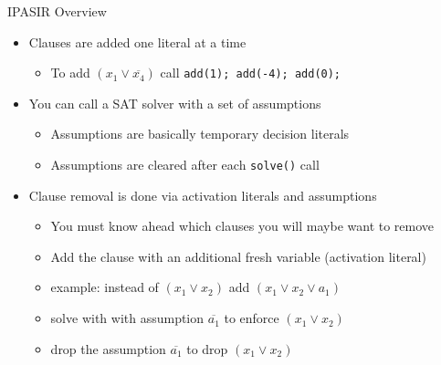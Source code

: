 \documentclass[t]{sdqbeamer}
\begin{document}
\begin{frame}{IPASIR Overview}
\begin{itemize}
\item Clauses are added one literal at a time
\begin{itemize}
	\item To add $(x_1 \vee \overline{x_4})$ call \texttt{add(1); add(-4); add(0);}
\end{itemize}
\item You can call a SAT solver with a set of assumptions
\begin{itemize}
	\item Assumptions are basically temporary decision literals
	\item Assumptions are cleared after each \texttt{solve()} call
\end{itemize}
\item Clause removal is done via activation literals and assumptions
\begin{itemize}
	\item You must know ahead which clauses you will maybe want to remove
	\item Add the clause with an additional fresh variable (activation literal)
	\item example: instead of $(x_1 \vee x_2)$ add $(x_1 \vee x_2 \vee a_1)$
	\item solve with with assumption $\overline{a_1}$ to enforce $(x_1 \vee x_2)$
	\item drop the assumption $\overline{a_1}$ to drop $(x_1 \vee x_2)$
\end{itemize}
\end{itemize}
\end{frame}

\end{document}
